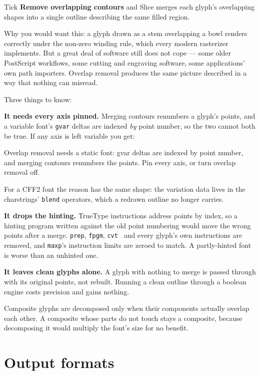 \documentclass[11pt,a4paper]{article}
\begin{document}
Tick \textbf{Remove overlapping contours} and Slice merges each glyph's overlapping shapes into a single outline describing the same filled region.

Why you would want this: a glyph drawn as a stem overlapping a bowl renders correctly under the non-zero winding rule, which every modern rasterizer implements. But a great deal of software still does not cope --- some older PostScript workflows, some cutting and engraving software, some applications' own path importers. Overlap removal produces the same picture described in a way that nothing can misread.

Three things to know:

\textbf{It needs every axis pinned.} Merging contours renumbers a glyph's points, and a variable font's \texttt{gvar} deltas are indexed \emph{by} point number, so the two cannot both be true. If any axis is left variable you get:

\begin{code}
Overlap removal needs a static font: gvar deltas are indexed by point number,
and merging contours renumbers the points. Pin every axis, or turn overlap
removal off.
\end{code}

For a CFF2 font the reason has the same shape: the variation data lives in the charstrings' \texttt{blend} operators, which a redrawn outline no longer carries.

\textbf{It drops the hinting.} TrueType instructions address points by index, so a hinting program written against the old point numbering would move the wrong points after a merge. \texttt{prep}, \texttt{fpgm}, \texttt{cvt } and every glyph's own instructions are removed, and \texttt{maxp}'s instruction limits are zeroed to match. A partly-hinted font is worse than an unhinted one.

\textbf{It leaves clean glyphs alone.} A glyph with nothing to merge is passed through with its original points, not rebuilt. Running a clean outline through a boolean engine costs precision and gains nothing.

Composite glyphs are decomposed only when their components actually overlap each other. A composite whose parts do not touch stays a composite, because decomposing it would multiply the font's size for no benefit.

\section{Output formats}
\end{document}
